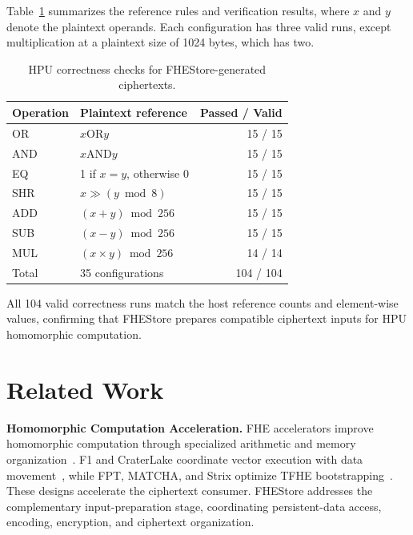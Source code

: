 \documentclass[sigconf,anonymous,balance=false]{acmart}
\newcommand{\bodypar}{\par\vskip 0pt plus 6pt\relax}
\begin{document}
Table~\ref{tab:hpu-correctness} summarizes the reference rules and verification results, where $x$ and $y$ denote the plaintext operands. Each configuration has three valid runs, except multiplication at a plaintext size of 1024 bytes, which has two.
\bodypar

\begin{table}[!htbp]
  \centering
  \caption{HPU correctness checks for FHEStore-generated ciphertexts.}
  \label{tab:hpu-correctness}
  \small
  \setlength{\tabcolsep}{3pt}
  \renewcommand{\arraystretch}{1.16}
  \begin{tabular*}{\columnwidth}{@{\extracolsep{\fill}}llr@{}}
    \toprule
    \textbf{Operation} & \textbf{Plaintext reference} & \textbf{Passed / Valid} \\
    \midrule
    OR & $x\mathbin{\mathrm{OR}}y$ & 15 / 15 \\
    AND & $x\mathbin{\mathrm{AND}}y$ & 15 / 15 \\
    EQ & 1 if $x=y$, otherwise 0 & 15 / 15 \\
    SHR & $x \gg (y\bmod 8)$ & 15 / 15 \\
    ADD & $(x+y)\bmod 256$ & 15 / 15 \\
    SUB & $(x-y)\bmod 256$ & 15 / 15 \\
    MUL & $(x\times y)\bmod 256$ & 14 / 14 \\
    \midrule
    Total & 35 configurations & 104 / 104 \\
    \bottomrule
  \end{tabular*}
\end{table}

All 104 valid correctness runs match the host reference counts and element-wise values, confirming that FHEStore prepares compatible ciphertext inputs for HPU homomorphic computation.
\bodypar

\section{Related Work}
\label{sec:related}
\noindent\textbf{Homomorphic Computation Acceleration.}
FHE accelerators improve homomorphic computation through specialized arithmetic and memory organization~\cite{xu2026hera,zhou2023fhemem,kim2022bts,kim2022ark}. F1 and CraterLake coordinate vector execution with data movement~\cite{samardzic2021f1,samardzic2022craterlake}, while FPT, MATCHA, and Strix optimize TFHE bootstrapping~\cite{vanbeirendonck2023fpt,jiang2022matcha,putra2023strix}. These designs accelerate the ciphertext consumer. FHEStore addresses the complementary input-preparation stage, coordinating persistent-data access, encoding, encryption, and ciphertext organization.
\bodypar
\end{document}
